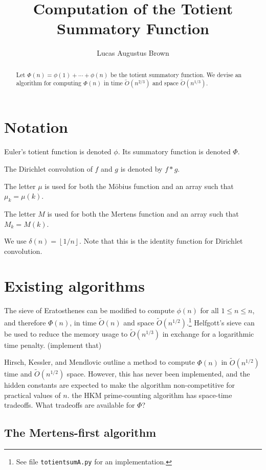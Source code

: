 \documentclass[12pt]{article}
\title{Computation of the Totient Summatory Function}
\author{Lucas Augustus Brown \orcidlink{0000-0002-6000-3735}}
\date{\currentdatetime}
\newcommand{\floor}[1]{{\left\lfloor #1 \right\rfloor}}
\newcommand{\softO}[0]{\widetilde{O}}
\begin{document}
\maketitle %

\begin{abstract}
Let $\Phi(n) = \phi(1) + \cdots + \phi(n)$ be the totient summatory function.  We devise an algorithm for computing $\Phi(n)$ in time $\softO(n^{2/3})$ and space $\softO(n^{1/3})$.
\end{abstract}

\section{Notation}

Euler's totient function is denoted $\phi$.  Its summatory function is denoted $\Phi$.

The Dirichlet convolution of $f$ and $g$ is denoted by $f*g$.

The letter $\mu$ is used for both the M\"{o}bius function and an array such that $\mu_k = \mu(k)$.

The letter $M$ is used for both the Mertens function and an array such that $M_k = M(k)$.

We use $\delta(n) = \floor{1/n}$.  Note that this is the identity function for Dirichlet convolution.

\section{Existing algorithms}

The sieve of Eratosthenes can be modified to compute $\phi(n)$ for all $1 \leq n \leq n$, and therefore $\Phi(n)$, in time $\softO(n)$ and space $\softO(n^{1/2})$.\footnote{See file \texttt{totientsumA.py} for an implementation.}  Helfgott's sieve \cite{Helfgott2020} can be used to reduce the memory usage to $\softO(n^{1/3})$ in exchange for a logarithmic time penalty.  (\todo implement that)

Hirsch, Kessler, and Mendlovic outline \cite[\S5.6]{HKM2024} a method to compute $\Phi(n)$ in $\softO(n^{1/2})$ time and $\softO(n^{1/2})$ space.  However, this has never been implemented, and the hidden constants are expected to make the algorithm non-competitive for practical values of $n$.  \todo the HKM prime-counting algorithm has space-time tradeoffs.  What tradeoffs are available for $\Phi$?

\subsection{The Mertens-first algorithm}
\end{document}
